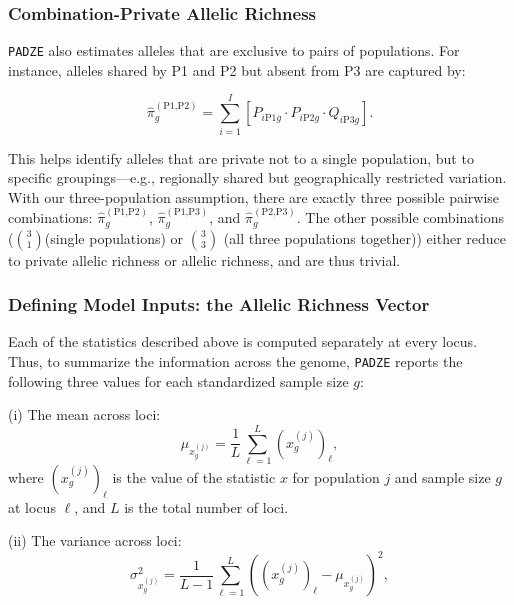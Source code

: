 \documentclass[11pt]{article}
\theoremstyle{plain}
\theoremstyle{definition}
\theoremstyle{remark}
\begin{document}
\subsubsection{Combination-Private Allelic Richness}

\texttt{PADZE} also estimates alleles that are exclusive to pairs of populations. For instance, alleles shared by P1 and P2 but absent from P3 are captured by:

\begin{equation}
\hat{\pi}^{(\text{P1,P2})}_{g} = \sum_{i=1}^{I} \left[ P_{i\text{P1}g} \cdot P_{i\text{P2}g} \cdot Q_{i\text{P3}g} \right].
\end{equation}

This helps identify alleles that are private not to a single population, but to specific groupings—e.g., regionally shared but geographically restricted variation. With our three-population assumption, there are exactly three possible pairwise combinations: $\hat{\pi}^{(\text{P1,P2})}_{g}$, $\hat{\pi}^{(\text{P1,P3})}_{g}$, and $\hat{\pi}^{(\text{P2,P3})}_{g}$. The other possible combinations ($\binom{3}{1}$(single populations) or $\binom{3}{3}$ (all three populations together)) either reduce to private allelic richness or allelic richness, and are thus trivial.

\subsubsection{Defining Model Inputs: the Allelic Richness Vector}

Each of the statistics described above is computed separately at every locus. Thus, to summarize the information across the genome, \texttt{PADZE} reports the following three values for each standardized sample size $g$:

(i) The mean across loci:
    \begin{equation}
    \mu_{x^{(j)}_g} = \frac{1}{L} \sum_{\ell=1}^{L} ({x^{(j)}_g})_\ell,
    \end{equation}
    where $({x^{(j)}_g})_\ell$ is the value of the statistic $x$ for population $j$ and sample size $g$ at locus $\ell$, and $L$ is the total number of loci.
    
(ii) The variance across loci:
    \begin{equation}
    \sigma^2_{x^{(j)}_g} = \frac{1}{L - 1} \sum_{\ell=1}^{L} \left(({x^{(j)}_g})_\ell - \mu_{x^{(j)}_g} \right)^2,
    \end{equation}
    
\end{document}
